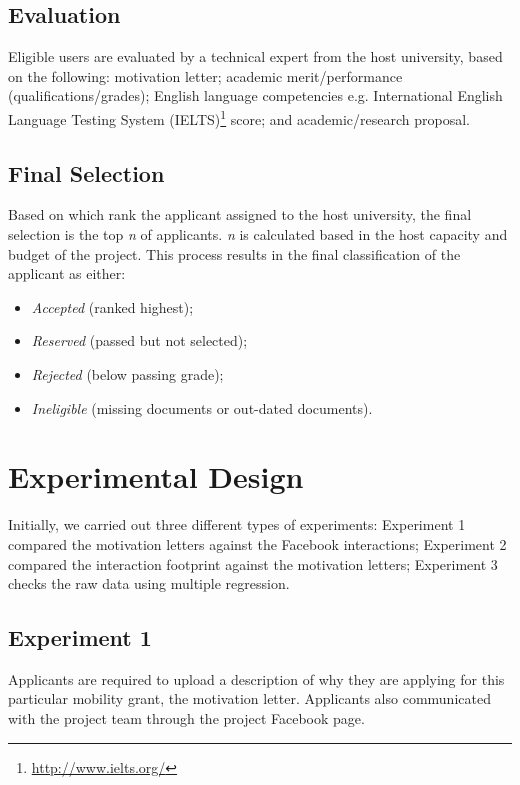 \documentclass[letterpaper]{article}
\begin{document}
\subsection{Evaluation}

Eligible users are evaluated by a technical expert from the host
university, based on the following: motivation letter; academic
merit/performance (qualifications/grades); English language
competencies e.g. International English Language Testing System
(IELTS)\footnote{\url{http://www.ielts.org/}} score; and
academic/research proposal.

\subsection{Final Selection}

Based on which rank the applicant assigned to the host university, the
final selection is the top {\emph{n}} of applicants. {\emph{n}} is
calculated based in the host capacity and budget of the project. This
process results in the final classification of the applicant as
either:

\begin{itemize}
\item {\emph{Accepted}} (ranked highest);
\item {\emph{Reserved}} (passed but not selected);
\item {\emph{Rejected}} (below passing grade); 
\item {\emph{Ineligible}} (missing documents or out-dated documents).
\end{itemize}


\section{Experimental Design}

Initially, we carried out three different types of experiments:
Experiment 1 compared the motivation letters against the Facebook
interactions; Experiment 2 compared the interaction footprint against
the motivation letters; Experiment 3 checks the raw data using
multiple regression.

\subsection{Experiment 1}

Applicants are required to upload a description of why they are
applying for this particular mobility grant, the motivation
letter. Applicants also communicated with the project team through the
project Facebook page.
\end{document}
